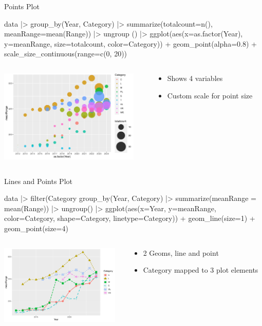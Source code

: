 \documentclass[ignorenonframetext,xcolor=x11names]{beamer}
\begin{document}
\begin{frame}[fragile]{Points Plot}
\begin{Rcode}
data |> 
  group_by(Year, Category) |>
  summarize(totalcount=n(), meanRange=mean(Range)) |>
  ungroup () |>
ggplot(aes(x=as.factor(Year), y=meanRange, 
           size=totalcount, color=Category)) +
  geom_point(alpha=0.8) +
  scale_size_continuous(range=c(0, 20))
\end{Rcode}
\begin{columns}
\begin{column}{.55\textwidth}
  \includegraphics[height=1.75in]{fuel.pointsSize.pdf}
\end{column}
\begin{column}{.35\textwidth}
\footnotesize
\begin{itemize}
   \item Shows 4 variables
   \item Custom scale for point size
\end{itemize}
\end{column}
\end{columns}
\end{frame}

\begin{frame}[fragile]{Lines and Points Plot}
\begin{Rcode}
data |> 
  filter(Category %
  group_by(Year, Category) |>
  summarize(meanRange = mean(Range)) |>
  ungroup() |>
ggplot(aes(x=Year, y=meanRange, 
      color=Category, shape=Category, linetype=Category)) +
  geom_line(size=1) + 
  geom_point(size=4)  
\end{Rcode}
\begin{columns}
\begin{column}{.55\textwidth}
  \includegraphics[height=1.5in]{fuel.linesPoints.pdf}
\end{column}
\begin{column}{.4\textwidth}
\footnotesize
\begin{itemize}
   \item 2 Geoms, line and point
   \item Category mapped to 3 plot elements
\end{itemize}
\end{column}
\end{columns}
\end{frame}
\end{document}
